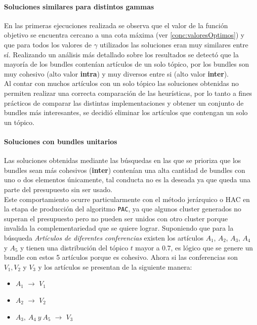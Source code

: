 \paragraph{Soluciones similares para distintos gammas}
En las primeras ejecuciones realizada se observa que el valor de la función objetivo se encuentra cercano a una cota máxima (ver \ref{conc:valoresOptimos}) y que para todos los valores de $\gamma$ utilizados las soluciones eran muy similares entre sí. Realizando un análisis más detallado sobre los resultados se detectó que la mayoría de los bundles contenían artículos de un solo tópico, por los bundles son muy cohesivo (alto valor \textbf{intra}) y muy diversos entre si (alto valor \textbf{inter}).\\
Al contar con muchos artículos con un solo tópico las soluciones obtenidas no permiten realizar una correcta comparación de las heurísticas, por lo tanto a fines prácticos de comparar las distintas implementaciones y obtener un conjunto de bundles más interesantes, se decidió eliminar los artículos que contengan un solo un tópico.
\paragraph{Soluciones con bundles unitarios}
Las soluciones obtenidas mediante las búsquedas en las que se prioriza que los bundles sean más cohesivos (\textbf{inter}) contenían una alta cantidad de bundles con uno o dos elementos únicamente, tal conducta no es la deseada ya que queda una parte del presupuesto sin ser usado.\\
Este comportamiento ocurre particularmente con el método jerárquico o HAC en la etapa de producción del algoritmo \texttt{PAC}, ya que algunos cluster generados no superan el presupuesto pero no pueden ser unidos con otro cluster porque invalida la complementariedad que se quiere lograr. Suponiendo que para la búsqueda \textit{Artículos de diferentes conferencias} existen los artículos $A_1$, $A_2$, $A_3$, $A_4$ y $A_5$ y tienen una distribución del tópico $t$ mayor a $0.7$, es lógico que se genere un bundle con estos 5 artículos porque es cohesivo. Ahora si las conferencias son $V_1, V_2$ y $V_3$ y los artículos se presentan de la siguiente manera:
\begin{itemize}
	\item $A_1$ $\rightarrow$ $V_1$
	\item $A_2$ $\rightarrow$ $V_2$
	\item $A_3,\ A_4\ y\ A_5$ $\rightarrow$ $V_3$
\end{itemize} 

